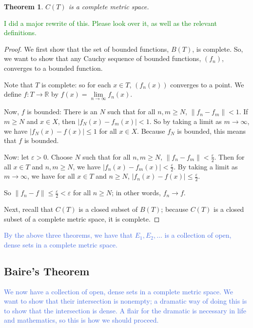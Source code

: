\documentclass{amsart}
\newcommand{\vep}{\varepsilon}
\newcommand{\R}{\mathbb{R}}
\newcommand{\colorcomment}[2]{\textcolor{#1}{#2}} %
\newcommand{\absval}[1]{\lvert #1 \rvert}
\newcommand{\norm}[1]{\|#1\|}
\newtheorem{thm}{Theorem}[section]
\theoremstyle{definition}
\begin{document}
\begin{thm}
$C(T)$ is a complete metric space. %
\end{thm}

\colorcomment{Green}{I did a major rewrite of this. Please look over it, as well as the relevant definitions.}

\begin{proof}
We first show that the set of bounded functions, $B(T)$, is complete.
So, we want to show that any Cauchy sequence of bounded functions, $(f_n)$, converges to a bounded function.

Note that $T$ is complete: so for each $x \in T$, $(f_n(x))$ converges to a point. We define $f: T \to \R$ by $f(x) = \lim\limits_{n \to \infty} f_n(x)$.

Now, $f$ is bounded: 
There is an $N$ such that for all $n,m \geq N$, $\norm{f_n-f_m} < 1$.
If $m \geq N$ and $x \in X$, then $\absval{f_N(x) - f_m(x)} < 1$.
So by taking a limit as $m \to \infty$, we have $\absval{f_N(x) - f(x)} \leq 1$ for all $x \in X$.
Because $f_N$ is bounded, this means that $f$ is bounded.

Now: let $\vep >0$. Choose $N$ such that for all $n,m \geq N$, $\norm{f_n-f_m} < \frac{\vep}{2}$. 
Then for all $x \in T$ and $n,m \geq N$, we have $\absval{f_n(x) - f_m(x)} < \frac{\vep}{2}$.
By taking a limit as $m \to \infty$, we have for all $x \in T$ and $n \geq N$, $\absval{f_n(x) - f(x)} \leq \frac{\vep}{2}$.

So $\norm{f_n - f} \leq \frac{\vep}{2} < \vep$ for all $n \geq N$; in other words, $f_n \to f$.

Next, recall that $C(T)$ is a closed subset of $B(T)$; because $C(T)$ is a closed subset of a complete metric space, it is complete.

\end{proof}

\colorcomment{RoyalBlue}{By the above three theorems, we have that $E_1, E_2, \ldots$ is a collection of open, dense sets in a complete metric space.}

\subsection{Baire's Theorem}

\colorcomment{RoyalBlue}{We now have a collection of open, dense sets in a complete metric space. 
We want to show that their intersection is nonempty; a dramatic way of doing this is to show that the intersection is dense. 
A flair for the dramatic is necessary in life and mathematics, so this is how we should proceed.}
\end{document}
